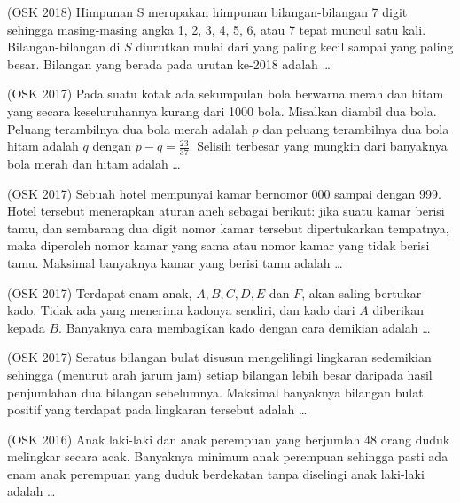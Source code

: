 \documentclass[11pt]{scrartcl}
\begin{document}
	\begin{soalbaru}
	(OSK 2018) Himpunan S merupakan himpunan bilangan-bilangan 7 digit sehingga masing-masing angka 1, 2, 3,
4, 5, 6, atau 7 tepat muncul satu kali. Bilangan-bilangan di $S$ diurutkan mulai dari yang paling kecil
sampai yang paling besar. Bilangan yang berada pada urutan ke-2018 adalah \dots
	\end{soalbaru}
	
	\begin{soalbaru}
	(OSK 2017) Pada suatu kotak ada sekumpulan bola berwarna merah dan hitam yang secara keseluruhannya
kurang dari 1000 bola. Misalkan diambil dua bola. Peluang terambilnya dua bola merah adalah $p$
dan peluang terambilnya dua bola hitam adalah $q$ dengan $p-q =\frac{23}{37}$. Selisih terbesar yang mungkin dari banyaknya bola merah dan hitam adalah \dots
	\end{soalbaru}
	
	\begin{soalbaru}(OSK 2017)
	Sebuah hotel mempunyai kamar bernomor 000 sampai dengan 999. Hotel tersebut menerapkan
aturan aneh sebagai berikut: jika suatu kamar berisi tamu, dan sembarang dua digit nomor kamar
tersebut dipertukarkan tempatnya, maka diperoleh nomor kamar yang sama atau nomor kamar
yang tidak berisi tamu. Maksimal banyaknya kamar yang berisi tamu adalah \dots
	\end{soalbaru}
	
	\begin{soalbaru}
	(OSK 2017) Terdapat enam anak, $A, B, C, D, E$ dan $F$, akan saling bertukar kado. Tidak ada yang menerima
kadonya sendiri, dan kado dari $A$ diberikan kepada $B$. Banyaknya cara membagikan kado dengan
cara demikian adalah \dots
	\end{soalbaru}
	
	\begin{soalbaru}
	(OSK 2017) Seratus bilangan bulat disusun mengelilingi lingkaran sedemikian sehingga (menurut arah jarum
jam) setiap bilangan lebih besar daripada hasil penjumlahan dua bilangan sebelumnya. Maksimal
banyaknya bilangan bulat positif yang terdapat pada lingkaran tersebut adalah \dots
	\end{soalbaru}
	
	\begin{soalbaru}
	(OSK 2016)
	Anak laki-laki dan anak perempuan yang berjumlah 48 orang duduk melingkar secara acak.
Banyaknya minimum anak perempuan sehingga pasti ada enam anak perempuan yang duduk
berdekatan tanpa diselingi anak laki-laki adalah \dots
	\end{soalbaru}
	
\end{document}
